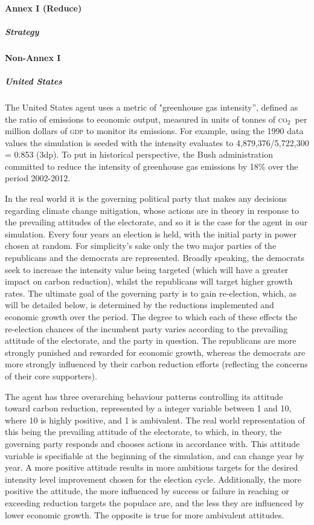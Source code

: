 \documentclass[]{article} %
\newcommand{\CO}{\textsc{co}$_2$~}
\begin{document}
\paragraph{Annex I (Reduce)}



\subparagraph{Strategy}

\paragraph{Non-Annex I}

\subparagraph{United States}

The United States agent uses a metric of "greenhouse gas intensity”, defined as the ratio of emissions to economic output, measured in units of tonnes of \CO per million dollars of \textsc{gdp} to monitor its emissions. For example, using the 1990 data values the simulation is seeded with the intensity evaluates to 4,879,376/5,722,300 = 0.853 (3dp). To put in historical perspective, the Bush administration committed to reduce the intensity of greenhouse gas emissions by 18\% over the period 2002-2012.

In the real world it is the governing political party that makes any decisions regarding climate change mitigation, whose actions are in theory in response to the prevailing attitudes of the electorate, and so it is the case for the agent in our simulation. Every four years an election is held, with the initial party in power chosen at random. For simplicity’s sake only the two major parties of the republicans and the democrats are represented. Broadly speaking, the democrats seek to increase the intensity value being targeted (which will have a greater impact on carbon reduction), whilst the republicans will target higher growth rates. The ultimate goal of the governing party is to gain re-election, which, as will be detailed below, is determined by the reductions implemented and economic growth over the period. The degree to which each of these effects the re-election chances of the incumbent party varies according to the prevailing attitude of the electorate, and the party in question. The republicans are more strongly punished and rewarded for economic growth, whereas the democrats are more strongly influenced by their carbon reduction efforts (reflecting the concerns of their core supporters). 

The agent has three overarching behaviour patterns controlling its attitude toward carbon reduction, represented by a integer variable between 1 and 10, where 10 is highly positive, and 1  is ambivalent. The real world representation of this being the prevailing attitude of the electorate, to which, in theory, the governing party responds and chooses actions in accordance with. This attitude variable is specifiable at the beginning of the simulation, and can change year by year. A more positive attitude results in more ambitious targets for the desired intensity level improvement chosen for the election cycle. Additionally, the more positive the attitude, the more influenced by success or failure in reaching or exceeding reduction targets the populace are, and the less they are influenced by lower economic growth. The opposite is true for more ambivalent attitudes.
\end{document}
